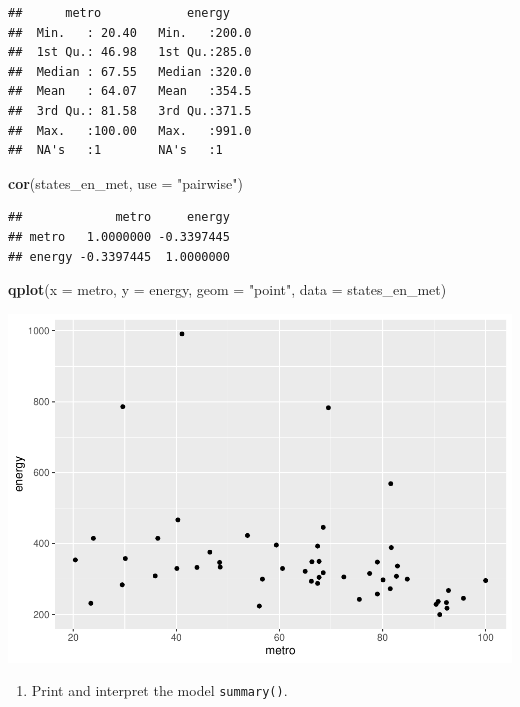 \documentclass[
]{book}
\newenvironment{Shaded}{\begin{snugshade}}{\end{snugshade}}
\newcommand{\DataTypeTok}[1]{\textcolor[rgb]{0.13,0.29,0.53}{#1}}
\newcommand{\KeywordTok}[1]{\textcolor[rgb]{0.13,0.29,0.53}{\textbf{#1}}}
\newcommand{\NormalTok}[1]{#1}
\newcommand{\StringTok}[1]{\textcolor[rgb]{0.31,0.60,0.02}{#1}}
\providecommand{\tightlist}{%
  \setlength{\itemsep}{0pt}\setlength{\parskip}{0pt}}
\begin{document}
\begin{verbatim}
##      metro            energy     
##  Min.   : 20.40   Min.   :200.0  
##  1st Qu.: 46.98   1st Qu.:285.0  
##  Median : 67.55   Median :320.0  
##  Mean   : 64.07   Mean   :354.5  
##  3rd Qu.: 81.58   3rd Qu.:371.5  
##  Max.   :100.00   Max.   :991.0  
##  NA's   :1        NA's   :1
\end{verbatim}

\begin{Shaded}
\begin{Highlighting}[]
  \KeywordTok{cor}\NormalTok{(states\_en\_met, }\DataTypeTok{use =} \StringTok{"pairwise"}\NormalTok{)}
\end{Highlighting}
\end{Shaded}

\begin{verbatim}
##             metro     energy
## metro   1.0000000 -0.3397445
## energy -0.3397445  1.0000000
\end{verbatim}

\begin{Shaded}
\begin{Highlighting}[]
  \KeywordTok{qplot}\NormalTok{(}\DataTypeTok{x =}\NormalTok{ metro, }\DataTypeTok{y =}\NormalTok{ energy, }\DataTypeTok{geom =} \StringTok{"point"}\NormalTok{, }\DataTypeTok{data =}\NormalTok{ states\_en\_met)}
\end{Highlighting}
\end{Shaded}

\includegraphics{R/Rmodels/figures/unnamed-chunk-108-1.pdf}

\begin{enumerate}
\def\labelenumi{\arabic{enumi}.}
\setcounter{enumi}{1}
\tightlist
\item
  Print and interpret the model \texttt{summary()}.
\end{enumerate}
\end{document}
